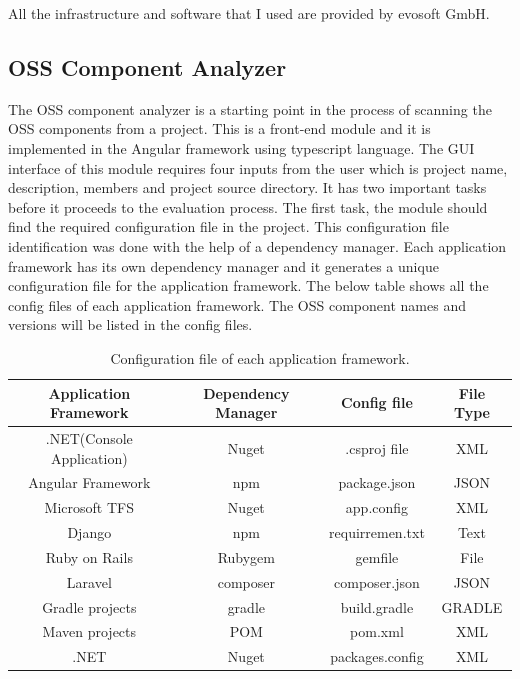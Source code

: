 All the infrastructure and software that I used are provided by evosoft GmbH.
\subsection{OSS Component Analyzer}
The OSS component analyzer is a starting point in the process of scanning the OSS components from a project. This is a front-end module and it is implemented in the Angular framework using typescript language. The GUI interface of this module requires four inputs from the user which is project name, description, members and project source directory. It has two important tasks before it proceeds to the evaluation process. The first task, the module should find the required configuration file in the project. This configuration file identification was done with the help of a dependency manager. Each application framework has its own dependency manager and it generates a unique configuration file for the application framework. The below table shows all the config files of each application framework. The OSS component names and versions will be listed in the config files. 
\begin{table}[h!]
\begin{center}
 \begin{tabular}{ |c|c|c|c| } 
 	\hline
 	Application Framework & Dependency Manager & Config file & File Type \\
 	\hline
 	.NET(Console Application) & Nuget & .csproj file & XML \\ 
 	Angular Framework & npm & package.json & JSON \\ 
 	Microsoft TFS & Nuget & app.config & XML \\ 
 	Django & npm & requirremen.txt & Text\\ 
 	Ruby on Rails & Rubygem & gemfile & File \\ 
 	Laravel & composer & composer.json & JSON \\ 
 	Gradle projects & gradle & build.gradle & GRADLE \\ 
 	Maven projects & POM & pom.xml & XML \\ 
 	.NET & Nuget & packages.config & XML \\ 
 	\hline
 \end{tabular}
\caption{Configuration file of each application framework.}\label{tab:configFiles}
\end{center} 
\end{table}


